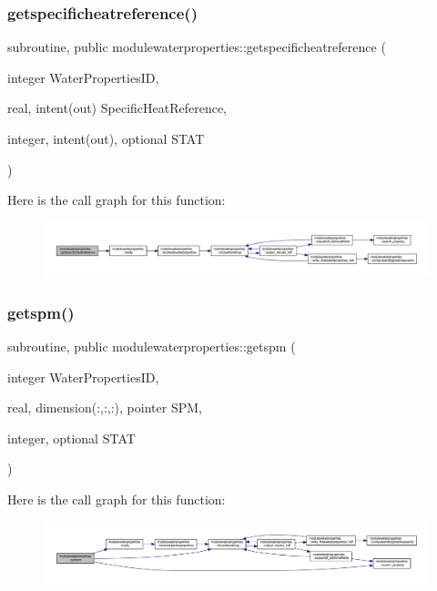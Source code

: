 \subsubsection{\texorpdfstring{getspecificheatreference()}{getspecificheatreference()}}
{\footnotesize\ttfamily subroutine, public modulewaterproperties\+::getspecificheatreference (\begin{DoxyParamCaption}\item[{integer}]{Water\+Properties\+ID,  }\item[{real, intent(out)}]{Specific\+Heat\+Reference,  }\item[{integer, intent(out), optional}]{S\+T\+AT }\end{DoxyParamCaption})}

Here is the call graph for this function\+:\nopagebreak
\begin{figure}[H]
\begin{center}
\leavevmode
\includegraphics[width=350pt]{namespacemodulewaterproperties_af502ab70c7f5479a4e039154e3b7b099_cgraph}
\end{center}
\end{figure}
\mbox{\label{namespacemodulewaterproperties_ae9ef33b9d5369265c98090b0520a41ae}} 
\subsubsection{\texorpdfstring{getspm()}{getspm()}}
{\footnotesize\ttfamily subroutine, public modulewaterproperties\+::getspm (\begin{DoxyParamCaption}\item[{integer}]{Water\+Properties\+ID,  }\item[{real, dimension(\+:,\+:,\+:), pointer}]{S\+PM,  }\item[{integer, optional}]{S\+T\+AT }\end{DoxyParamCaption})}

Here is the call graph for this function\+:\nopagebreak
\begin{figure}[H]
\begin{center}
\leavevmode
\includegraphics[width=350pt]{namespacemodulewaterproperties_ae9ef33b9d5369265c98090b0520a41ae_cgraph}
\end{center}
\end{figure}
\mbox{\label{namespacemodulewaterproperties_a98876d77f6e973aec7cd3341346e8d8b}} 
